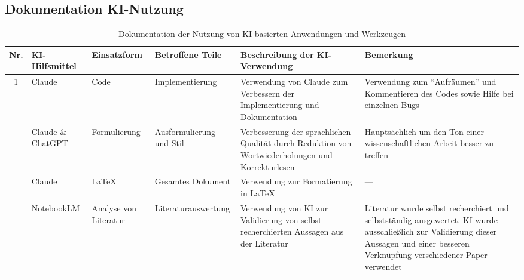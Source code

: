 \begin{landscape}
\section{Dokumentation KI-Nutzung}

\begin{table}[H]
\centering
\small
\renewcommand{\arraystretch}{1.25}
\begin{tabular}{@{}c|>{\raggedright\arraybackslash}p{2.5cm}|>{\raggedright\arraybackslash}p{2.4cm}|>{\raggedright\arraybackslash}p{2.9cm}|>{\raggedright\arraybackslash}p{6.6cm}|>{\raggedright\arraybackslash}p{6.6cm}@{}}
\toprule
\textbf{Nr.} & \textbf{KI-Hilfsmittel} & \textbf{Einsatzform} & \textbf{Betroffene Teile} & \textbf{Beschreibung der KI-Verwendung} & \textbf{Bemerkung} \\
\midrule
1 & Claude & Code & Implementierung & Verwendung von Claude zum Verbessern der Implementierung und Dokumentation & Verwendung zum \enquote{Aufräumen} und Kommentieren des Codes sowie Hilfe bei einzelnen Bugs \\
\hline\addlinespace
2 & Claude \& ChatGPT & Formulierung & Ausformulierung und Stil & Verbesserung der sprachlichen Qualität durch Reduktion von Wortwiederholungen und Korrekturlesen & Hauptsächlich um den Ton einer wissenschaftlichen Arbeit besser zu treffen \\
\hline\addlinespace
3 & Claude & LaTeX & Gesamtes Dokument & Verwendung zur Formatierung in LaTeX & --- \\
\hline\addlinespace
4 & NotebookLM & Analyse von Literatur & Literatur\-auswertung & Verwendung von KI zur Validierung von selbst recherchierten Aussagen aus der Literatur & Literatur wurde selbst recherchiert und selbstständig ausgewertet. KI wurde ausschließlich zur Validierung dieser Aussagen und einer besseren Verknüpfung verschiedener Paper verwendet \\
\bottomrule
\end{tabular}
\caption{Dokumentation der Nutzung von KI-basierten Anwendungen und Werkzeugen}
\label{tab:ki-nutzung}
\end{table}
\end{landscape}
\MSonehalfspacing
\newpage
\restoreapp
